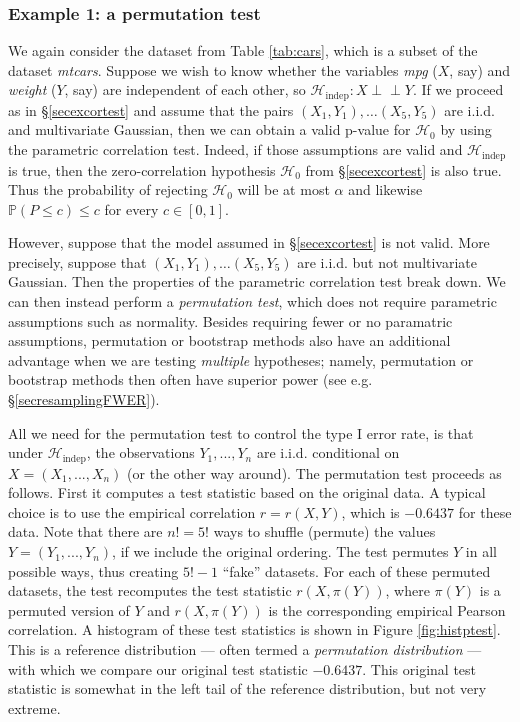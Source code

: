\documentclass[11pt]{article}
\theoremstyle{plain}
\theoremstyle{definition}
\newcommand{\Hy}{\mathcal{H}}
\newcommand{\pr}{\mathbb{P}}
\newcommand{\indep}{\mathrel{\perp\!\!\!\perp}}
\begin{document}
\subsubsection{Example 1: a permutation test} \label{secexptest}
We again consider the dataset from Table  \ref{tab:cars}, which is a subset of the dataset  \emph{mtcars}. Suppose we wish to know whether the variables \emph{mpg} ($X$, say) and \emph{weight} ($Y$, say) are independent of each other, so $\Hy_{\text{indep}}: X \indep Y$. If we proceed as in \S\ref{secexcortest} and assume that the pairs $(X_1,Y_1),\ldots(X_5,Y_5)$ are i.i.d. and  multivariate Gaussian, then we can obtain a valid p-value for $\Hy_0$ by using the parametric correlation test. Indeed, if those assumptions are valid and $\Hy_{\text{indep}}$ is true, then the zero-correlation hypothesis $\Hy_0$ from 
\S\ref{secexcortest} is also true. Thus the probability of rejecting $\Hy_0$ will be at most $\alpha$ and likewise
$\pr(P\leq c)\leq c$ for every $c\in[0,1]$. 

However, suppose that the model assumed in \S\ref{secexcortest}  is not valid. More precisely, suppose that $(X_1,Y_1),\ldots(X_5,Y_5)$ are i.i.d. but not multivariate Gaussian. Then the properties of the parametric correlation test break down. We can then instead perform a \emph{permutation test}, which does not require parametric assumptions such as normality. Besides requiring fewer or no paramatric assumptions, permutation or bootstrap methods also have an additional advantage when we are testing \emph{multiple} hypotheses; namely, permutation or bootstrap methods then often have superior power (see e.g. \S\ref{secresamplingFWER}).

All we need for the permutation test to control the type I error rate, is that under $\Hy_{\text{indep}}$, the observations $Y_1,...,Y_n$ are i.i.d. conditional on $X=(X_1,...,X_n)$ (or the other way around).
The permutation test proceeds as follows. First it computes a test statistic based on the original data. A typical choice is to use the empirical correlation $r=r(X,Y)$, which is $-0.6437$ for these data.
Note that there are $n!=5!$ ways to shuffle (permute) the values $Y=(Y_1,...,Y_n)$, if we include the original ordering. The test permutes $Y$ in all possible ways, thus creating $5!-1$ ``fake'' datasets. For each of these permuted datasets, the test recomputes the test statistic $r(X,\pi(Y))$, where $\pi(Y)$ is a permuted version of $Y$ and $r(X,\pi(Y))$ is the corresponding empirical Pearson correlation. A histogram of these  test statistics is shown in Figure \ref{fig:histptest}. This is a reference distribution --- often termed a \emph{permutation distribution} --- with which we compare our original test statistic $-0.6437$. This original test statistic is somewhat in the left tail of the reference distribution, but not very extreme.
\end{document}
